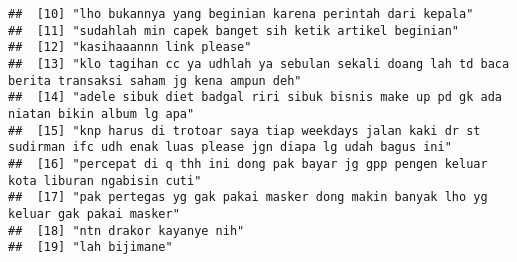 \documentclass[
]{article}
\begin{document}
\begin{verbatim}
##  [10] "lho bukannya yang beginian karena perintah dari kepala"                                                                                                                                                                                                                            
##  [11] "sudahlah min capek banget sih ketik artikel beginian"                                                                                                                                                                                                                              
##  [12] "kasihaaannn link please"                                                                                                                                                                                                                                                           
##  [13] "klo tagihan cc ya udhlah ya sebulan sekali doang lah td baca berita transaksi saham jg kena ampun deh"                                                                                                                                                                             
##  [14] "adele sibuk diet badgal riri sibuk bisnis make up pd gk ada niatan bikin album lg apa"                                                                                                                                                                                             
##  [15] "knp harus di trotoar saya tiap weekdays jalan kaki dr st sudirman ifc udh enak luas please jgn diapa lg udah bagus ini"                                                                                                                                                            
##  [16] "percepat di q thh ini dong pak bayar jg gpp pengen keluar kota liburan ngabisin cuti"                                                                                                                                                                                              
##  [17] "pak pertegas yg gak pakai masker dong makin banyak lho yg keluar gak pakai masker"                                                                                                                                                                                                 
##  [18] "ntn drakor kayanye nih"                                                                                                                                                                                                                                                            
##  [19] "lah bijimane"                                                                                                                                                                                                                                                                      

\end{verbatim}
\end{document}
